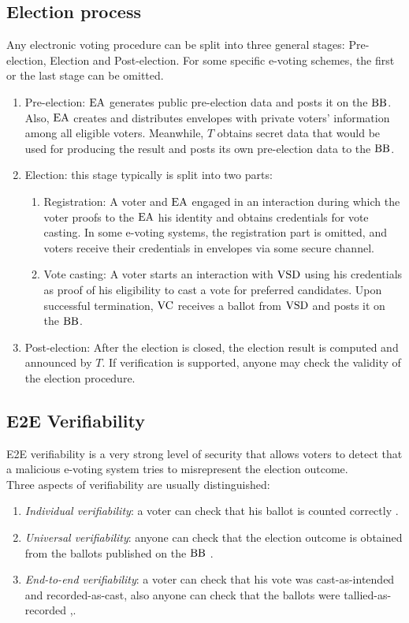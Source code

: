 \subsection{Election process}
Any electronic voting procedure can be split into three general stages: Pre-election, Election and Post-election. For some specific e-voting schemes, the first or the last stage can be omitted.
\begin{enumerate}
\item Pre-election: $\operatorname{EA}$ generates public pre-election data and posts it on the $\operatorname{BB}$. Also, $\operatorname{EA}$ creates and distributes envelopes with private voters' information among all eligible voters. Meanwhile, $T$ obtains secret data that would be used for producing the result and posts its own pre-election data to the $\operatorname{BB}$.
\item Election: this stage typically is split into two parts:
\begin{enumerate}
\item Registration: A voter and $\operatorname{EA}$ engaged in an interaction during which the voter proofs to the $\operatorname{EA}$ his identity and obtains credentials for vote casting. In some e-voting systems, the registration part is omitted, and voters receive their credentials in envelopes via some secure channel. 
\item Vote casting: A voter starts an interaction with $\operatorname{VSD}$ using his credentials as proof of his eligibility to cast a vote for preferred candidates. Upon successful termination, $\operatorname{VC}$ receives a ballot from $\operatorname{VSD}$ and posts it on the $\operatorname{BB}$. 
\end{enumerate}
\item Post-election: After the election is closed, the election result is computed and announced by $T$.  If verification is supported, anyone may check the validity of the election procedure. 
\end{enumerate}

\subsection{E2E Verifiability}
E2E verifiability is a very strong level of security that allows voters  to detect that a malicious e-voting system tries to misrepresent the election outcome. \\

Three aspects of verifiability are usually distinguished:
\begin{enumerate}
\item \textit{Individual verifiability}: a voter can check that his ballot is counted correctly \cite{Chaum1981}.
\item \textit{Universal verifiability}: anyone can check that the election outcome is obtained from the ballots published on the $\operatorname{BB}$ \cite{Sako1995}.
\item \textit{End-to-end verifiability}: a voter can check that his vote was cast-as-intended and recorded-as-cast, also anyone can check that the ballots were tallied-as-recorded \cite{Neff2004},\cite{Chaum2004}.
\end{enumerate}

